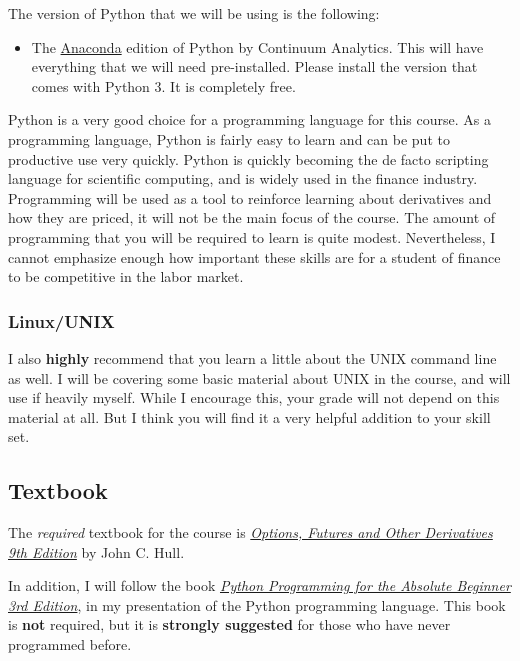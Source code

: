 \documentclass[]{article}
\begin{document}
The version of Python that we will be using is the following:

\begin{itemize}
 \item The \href{https://store.continuum.io/cshop/anaconda/}{Anaconda}
  edition of Python by Continuum Analytics. This will have everything
  that we will need pre-installed. Please install the version that comes
  with Python 3. It is completely free.
\end{itemize}

Python is a very good choice for a programming language for this course.
As a programming language, Python is fairly easy to learn and can be put
to productive use very quickly. Python is quickly becoming the de facto
scripting language for scientific computing, and is widely used in the
finance industry. Programming will be used as a tool to reinforce
learning about derivatives and how they are priced, it will not be the
main focus of the course. The amount of programming that you will be
required to learn is quite modest. Nevertheless, I cannot emphasize
enough how important these skills are for a student of finance to be
competitive in the labor market.

\subsubsection{Linux/UNIX}\label{linuxunix}

I also \textbf{highly} recommend that you learn a little about the UNIX
command line as well. I will be covering some basic material about UNIX
in the course, and will use if heavily myself. While I encourage this,
your grade will not depend on this material at all.
But I think you will find it a very helpful addition to your skill set.

\subsection{Textbook}\label{textbook}

The \emph{required} textbook for the course is
\emph{\href{http://goo.gl/G5O2fx}{Options, Futures and Other Derivatives 9th Edition}}
by John C. Hull.

In addition, I will follow the book
\emph{\href{http://goo.gl/iipcHA}{Python Programming for the Absolute Beginner 3rd Edition}}, in my
presentation of the Python programming language. This book is
\textbf{not} required, but it is \textbf{strongly suggested} for those
who have never programmed before. 
\end{document}
